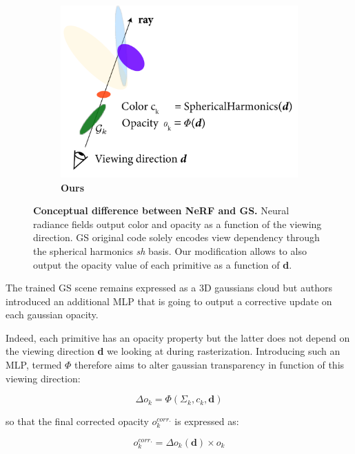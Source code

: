 \begin{figure}[htpb!]
\begin{subfigure}[b]{0.31\linewidth}
    \includegraphics[width=\linewidth]{images/gaussiansplatting/gs.png}
    \caption{\textbf{Ours}}
    \label{fig:gs-ray}
  \end{subfigure}
  \caption{\textbf{Conceptual difference between NeRF and GS.} Neural radiance fields output color and opacity as a function of the viewing direction. GS original code solely encodes view dependency through the spherical harmonics \textit{sh} basis. Our modification allows to also output the opacity value of each primitive as a function of \textbf{d}. }
  \label{fig:gs-nerf}
\end{figure}

The trained GS scene remains expressed as a 3D gaussians cloud but authors introduced an additional \ac{MLP} that is going to output a corrective update on each gaussian opacity. 

Indeed, each primitive has an opacity property but the latter does not depend on the viewing direction \textbf{d} we looking at during rasterization. Introducing such an \ac{MLP}, termed $\Phi$ therefore aims to alter gaussian transparency in function of this viewing direction: 

\begin{equation}
\Delta o_{k} = \Phi(\Sigma_{k},c_{k},\textbf{d}) 
\end{equation}

so that the final corrected opacity $o_{k}^{corr.}$ is expressed as: 

\begin{equation}
o_{k}^{corr.} = \Delta o_{k}(\textbf{d}) \times o_{k} 
\end{equation}

